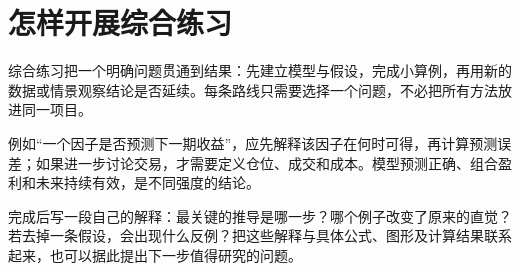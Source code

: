 \section{怎样开展综合练习}
综合练习把一个明确问题贯通到结果：先建立模型与假设，完成小算例，再用新的数据或情景观察结论是否延续。每条路线只需要选择一个问题，不必把所有方法放进同一项目。

例如“一个因子是否预测下一期收益”，应先解释该因子在何时可得，再计算预测误差；如果进一步讨论交易，才需要定义仓位、成交和成本。模型预测正确、组合盈利和未来持续有效，是不同强度的结论。

完成后写一段自己的解释：最关键的推导是哪一步？哪个例子改变了原来的直觉？若去掉一条假设，会出现什么反例？把这些解释与具体公式、图形及计算结果联系起来，也可以据此提出下一步值得研究的问题。

